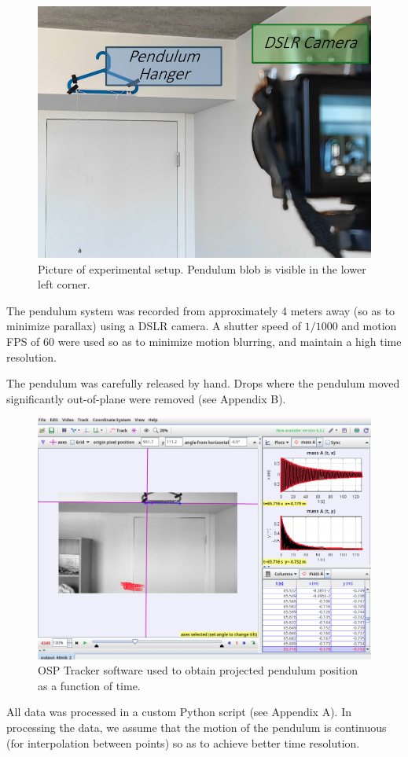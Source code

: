 \documentclass[prl,twocolumn,amsmath,amssymb,superscriptaddress]{revtex4-2}
\begin{document}
\begin{figure}[htb]
    \includegraphics[width=0.68\linewidth]{setup.png}
    \caption{Picture of experimental setup. Pendulum blob is visible in the lower left corner.}
    \label{fig:experiment_setup}
\end{figure}

\newpage

The pendulum system was recorded from approximately 4 meters away (so as to minimize parallax) using a DSLR camera. A shutter speed of $1/1000$ and motion FPS of $60$ were used so as to minimize motion blurring, and maintain a high time resolution.

The pendulum was carefully released by hand. Drops where the pendulum moved significantly out-of-plane were removed (see Appendix B).



\begin{figure}[htb]
    \includegraphics[width=0.7\linewidth]{tracker.png}
    \caption{OSP Tracker software used to obtain projected pendulum position as a function of time.}
    \label{fig:tracker}
\end{figure}

All data was processed in a custom Python script (see Appendix A). In processing the data, we assume that the motion of the pendulum is continuous (for interpolation between points) so as to achieve better time resolution.
\end{document}

